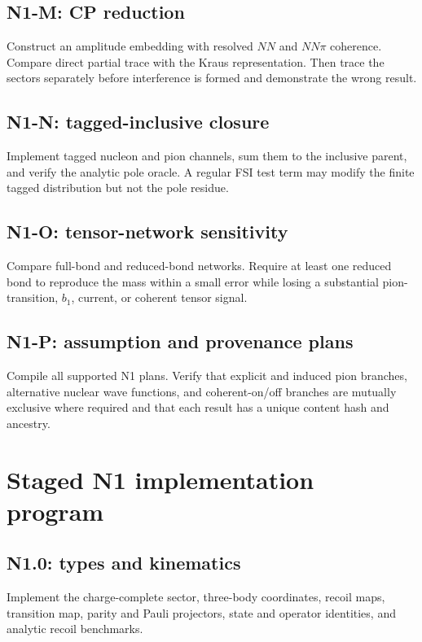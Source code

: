 \documentclass[11pt]{article}
\begin{document}
\subsection{N1-M: CP reduction}

Construct an amplitude embedding with resolved \(NN\) and \(NN\pi\) coherence.
Compare direct partial trace with the Kraus representation.  Then trace the
sectors separately before interference is formed and demonstrate the wrong
result.

\subsection{N1-N: tagged-inclusive closure}

Implement tagged nucleon and pion channels, sum them to the inclusive parent,
and verify the analytic pole oracle.  A regular FSI test term may modify the
finite tagged distribution but not the pole residue.

\subsection{N1-O: tensor-network sensitivity}

Compare full-bond and reduced-bond networks.  Require at least one reduced bond
to reproduce the mass within a small error while losing a substantial
pion-transition, \(b_1\), current, or coherent tensor signal.

\subsection{N1-P: assumption and provenance plans}

Compile all supported N1 plans.  Verify that explicit and induced pion
branches, alternative nuclear wave functions, and coherent-on/off branches
are mutually exclusive where required and that each result has a unique
content hash and ancestry.

\section{Staged N1 implementation program}
\label{sec:stages}

\subsection{N1.0: types and kinematics}

Implement the charge-complete sector, three-body coordinates, recoil maps,
transition map, parity and Pauli projectors, state and operator identities,
and analytic recoil benchmarks.
\end{document}
